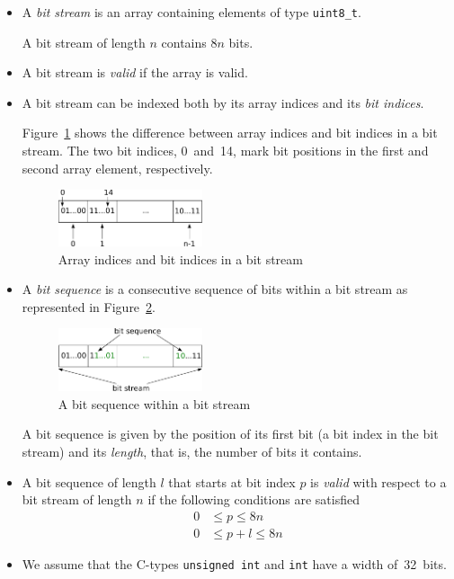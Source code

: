 \begin{itemize}
\item
A \emph{bit stream} is an array containing elements of type \verb"uint8_t".

A bit stream of length $n$ contains $8n$ bits.

\item
A bit stream is \emph{valid} if the array is valid.

\item 
A bit stream can be indexed both by its array indices
and its \emph{bit indices}.

Figure~\ref{fig:bitstream-indices} shows the difference between 
array indices and bit indices in a bit stream.
The two bit indices, 0~and~14,
mark bit positions in the first and second array element, respectively.

\begin{figure}[hbt]
\begin{center}
\includegraphics[width=0.40\textwidth]{figures/array_as_stream.pdf}
\caption{\label{fig:bitstream-indices} Array indices and bit indices in a bit stream}
\end{center}
\end{figure}


\item
A \emph{bit sequence} is a consecutive sequence of bits within a bit stream
as represented in Figure~\ref{fig:bitsequence}.
\begin{figure}[hbt]
\begin{center}
\includegraphics[width=0.40\textwidth]{figures/bit_sequence.pdf}
\caption{\label{fig:bitsequence} A bit sequence within a bit stream}
\end{center}
\end{figure}

A bit sequence is given by the position of its first bit (a bit index in the bit stream)
and its \emph{length}, that is, the number of bits it contains.

\item A bit sequence of length $l$ that starts at bit index $p$ is \emph{valid}
     with respect to a bit stream of length $n$ if the following conditions are
     satisfied
     \begin{align*}
         0 &\leq p \leq 8n \\
         0 &\leq p + l \leq 8n
     \end{align*}

\item 
We assume that the C-types \texttt{unsigned int} and \texttt{int}
have a width of~32~bits.

\end{itemize}

